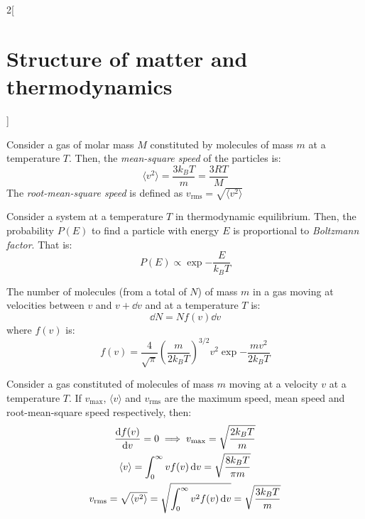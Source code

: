 \documentclass[../../../main.tex]{subfiles}
\begin{document}
\begin{multicols}{2}[\section{Structure of matter and thermodynamics}]
\begin{proposition}
  \end{proposition}
  \begin{proposition}
    Consider a gas of molar mass $M$ constituted by molecules of mass $m$ at a temperature $T$. Then, the \emph{mean-square speed} of the particles is: $$\langle v^2\rangle=\frac{3 k_B T}{m}=\frac{3 R T}{M}$$
    The \emph{root-mean-square speed} is defined as $v_\text{rms}=\sqrt{\langle v^2\rangle}$
  \end{proposition}
  \begin{proposition}
    Consider a system at a temperature $T$ in thermodynamic equilibrium. Then, the probability $P(E)$ to find a particle with energy $E$ is proportional to \emph{Boltzmann factor}. That is:
    $$P(E)\propto\exp{-\frac{E}{k_BT}}$$
  \end{proposition}
  \begin{proposition}
    The number of molecules (from a total of $N$) of mass $m$ in a gas moving at velocities between $v$ and $v+\dd{v}$ and at a temperature $T$ is:
    $$\dd{N}=Nf(v)\dd{v}$$ where $f(v)$ is: $$f(v)=\frac{4}{\sqrt{\pi}}{\left(\frac{m}{2k_BT}\right)}^{3/2}v^2\exp{-\frac{mv^2}{2k_BT}}$$
  \end{proposition}
  \begin{proposition}
    Consider a gas constituted of molecules of mass $m$ moving at a velocity $v$ at a temperature $T$. If $v_\text{max}$, $\langle v\rangle$ and $v_\text{rms}$ are the maximum speed, mean speed and root-mean-square speed respectively, then:
    \begin{gather*}
      \dv{f(v)}{v}=0\implies v_\text{max}=\sqrt{\frac{2k_BT}{m}}\\
      \langle v\rangle=\int_0^\infty vf(v)\dd{v}=\sqrt{\frac{8k_BT}{\pi m}}\\
      v_\text{rms}=\sqrt{\langle v^2\rangle}=\sqrt{\int_0^\infty v^2f(v)\dd{v}}=\sqrt{\frac{3k_BT}{m}}
    \end{gather*}
  \end{proposition}

\end{multicols}
\end{document}
